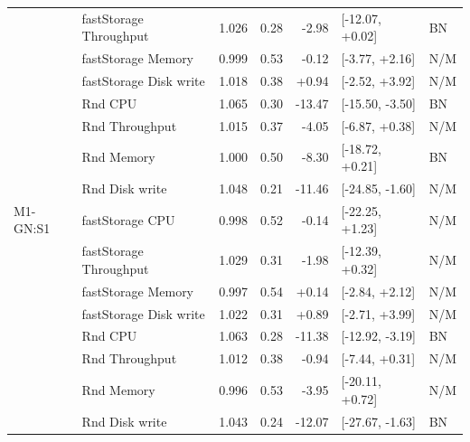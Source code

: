 \begin{longtable}{@{}llrrrll@{}}
 & fastStorage Throughput & 1.026 & 0.28 & -2.98 & [-12.07, +0.02] & BN \\
 & fastStorage Memory & 0.999 & 0.53 & -0.12 & [-3.77, +2.16] & N/M \\
 & fastStorage Disk write & 1.018 & 0.38 & +0.94 & [-2.52, +3.92] & N/M \\
 & Rnd CPU & 1.065 & 0.30 & -13.47 & [-15.50, -3.50] & BN \\
 & Rnd Throughput & 1.015 & 0.37 & -4.05 & [-6.87, +0.38] & N/M \\
 & Rnd Memory & 1.000 & 0.50 & -8.30 & [-18.72, +0.21] & BN \\
 & Rnd Disk write & 1.048 & 0.21 & -11.46 & [-24.85, -1.60] & N/M \\
\addlinespace
M1-GN:S1 & fastStorage CPU & 0.998 & 0.52 & -0.14 & [-22.25, +1.23] & N/M \\
 & fastStorage Throughput & 1.029 & 0.31 & -1.98 & [-12.39, +0.32] & N/M \\
 & fastStorage Memory & 0.997 & 0.54 & +0.14 & [-2.84, +2.12] & N/M \\
 & fastStorage Disk write & 1.022 & 0.31 & +0.89 & [-2.71, +3.99] & N/M \\
 & Rnd CPU & 1.063 & 0.28 & -11.38 & [-12.92, -3.19] & BN \\
 & Rnd Throughput & 1.012 & 0.38 & -0.94 & [-7.44, +0.31] & N/M \\
 & Rnd Memory & 0.996 & 0.53 & -3.95 & [-20.11, +0.72] & N/M \\
 & Rnd Disk write & 1.043 & 0.24 & -12.07 & [-27.67, -1.63] & BN \\
\bottomrule
\end{longtable}

